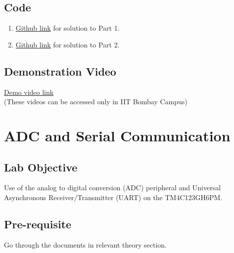 \documentclass[a4paper,12pt,oneside]{book}
\begin{document}
\section{Code}
\begin{enumerate}
\item \href{https://github.com/eYSIP-2016/eYSIP-2016-Around-the-world-of-Embedded-Systems/blob/origin/master/Solutions/lab3\%20solutions/lab3_solution1.c}{Github link} for solution to Part 1.
\item \href{https://github.com/eYSIP-2016/eYSIP-2016-Around-the-world-of-Embedded-Systems/blob/origin/master/Solutions/lab3\%20solutions/lab3_solution2.c}{Github link} for solution to Part 2.
\end{enumerate}
\section{Demonstration Video}
\href{: http://10.129.139.139/videos/Lab3.html}{Demo video link}\\
(These videos can be accessed only in IIT Bombay Campus)



\chapter{ADC and Serial Communication}
\section{Lab Objective}
Use of the analog to digital conversion (ADC) peripheral and Universal Asynchronous Receiver/Transmitter (UART) on the TM4C123GH6PM.


\section{Pre-requisite}
Go through the documents in relevant theory section.


\end{document}

